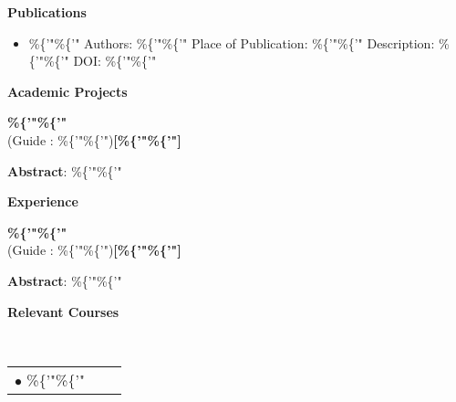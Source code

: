 \documentclass[a4paper,10pt]{article}
\begin{document}
\colorbox{titleColor}{\parbox{6.7in}{\textbf{Publications}}} 

    \begin{itemize}

\setlength{\itemsep}{1pt}
\item \%\{'"\%\{'"
\newline Authors: \%\{'"\%\{'"
\newline Place of Publication: \%\{'"\%\{'"
\newline Description: \%\{'"\%\{'"
\newline DOI: \%\{'"\%\{'"

\end{itemize}

\colorbox{titleColor}{\parbox{6.7in}{\textbf{Academic Projects}}}

\begin{itemize*}
\setlength{\itemsep}{1pt}
\item \textbf{\%\{'"\%\{'"}
 \\ {(Guide : \%\{'"\%\{'")}\hfill {\small{{\textbf{[\%\{'"\%\{'"]}}\/}}
\begin{itemize*}
\setlength{\itemsep}{.00pt}

            \item \textbf{Abstract}: \%\{'"\%\{'" 

            \end{itemize*} 

            \end{itemize*} 

\colorbox{titleColor}{\parbox{6.7in}{\textbf{Experience}}}

\begin{itemize*}
\setlength{\itemsep}{1pt}
\item \textbf{\%\{'"\%\{'"}
 \\ {(Guide : \%\{'"\%\{'")}\hfill {\small{{\textbf{[\%\{'"\%\{'"]}}\/}}
\begin{itemize*}
\setlength{\itemsep}{.00pt}

            \item \textbf{Abstract}: \%\{'"\%\{'" 

            \end{itemize*} 

            \end{itemize*} 

\colorbox{titleColor}{\parbox{6.7in}{\textbf{Relevant Courses}}}\\[0.08in]
    \begin{tabular}{p{3.5in}p{3in}p{2.5in}}
\hspace{0.9pc}$\bullet$ \%\{'"\%\{'"
\end{tabular}
\end{document}
